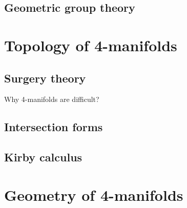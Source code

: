 \documentclass{../../large}
\begin{document}
\chapter{Geometric group theory}
\section{}


\part{Topology of 4-manifolds}
\chapter{Surgery theory}
Why 4-manifolds are difficult?
\chapter{Intersection forms}
\chapter{Kirby calculus}


\part{Geometry of 4-manifolds}
\chapter{}
\chapter{}
\chapter{}
\end{document}
